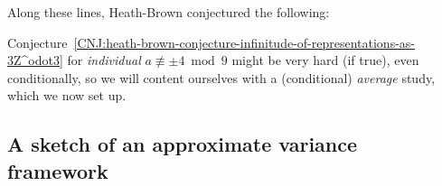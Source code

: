 \documentclass[12pt]{report}
\begin{document}

Along these lines,
Heath-Brown conjectured the following:

Conjecture~\ref{CNJ:heath-brown-conjecture-infinitude-of-representations-as-3Z^odot3} for \emph{individual} $a\not\equiv\pm4\bmod{9}$ might be very hard (if true),
even conditionally,
so we will content ourselves with a (conditional) \emph{average} study,
which we now set up.
\subsection{A sketch of an approximate variance framework}
\end{document}
